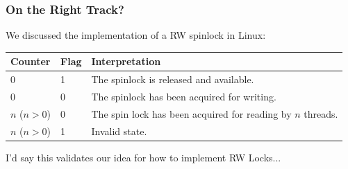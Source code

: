 \begin{frame}
\frametitle{On the Right Track?}

 We discussed the implementation of a RW spinlock in Linux:

\begin{center}
	\begin{tabular}{l|l|l}
		\textbf{Counter} & \textbf{Flag} & \textbf{Interpretation}                                     \\\hline
		0                & 1             & The spinlock is released and available.                     \\
		0                & 0             & The spinlock has been acquired for writing.                 \\
		$n$ ($n > 0$)    & 0             & The spin lock has been acquired for reading by $n$ threads. \\
		$n$ ($n > 0$)    & 1             & Invalid state.                                              \\
	\end{tabular}
\end{center}

I'd say this validates our idea for how to implement RW Locks...

\end{frame}



